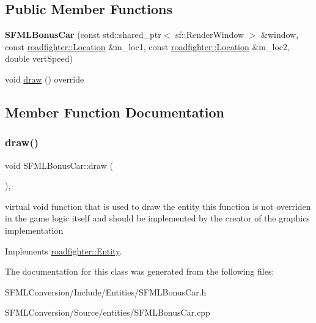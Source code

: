\subsection*{Public Member Functions}
\begin{DoxyCompactItemize}
\item 
\mbox{\label{classSFMLBonusCar_a891d1bc1e689c6343799ea8984ef2f9e}} 
{\bfseries S\+F\+M\+L\+Bonus\+Car} (const std\+::shared\+\_\+ptr$<$ sf\+::\+Render\+Window $>$ \&window, const \hyperlink{classroadfighter_1_1Location}{roadfighter\+::\+Location} \&m\+\_\+loc1, const \hyperlink{classroadfighter_1_1Location}{roadfighter\+::\+Location} \&m\+\_\+loc2, double vert\+Speed)
\item 
void \hyperlink{classSFMLBonusCar_a95d6a17fdbd099db1fe080da1581da20}{draw} () override
\end{DoxyCompactItemize}


\subsection{Member Function Documentation}
\mbox{\label{classSFMLBonusCar_a95d6a17fdbd099db1fe080da1581da20}} 
\subsubsection{\texorpdfstring{draw()}{draw()}}
{\footnotesize\ttfamily void S\+F\+M\+L\+Bonus\+Car\+::draw (\begin{DoxyParamCaption}{ }\end{DoxyParamCaption})\hspace{0.3cm}{\ttfamily [override]}, {\ttfamily [virtual]}}

virtual void function that is used to draw the entity this function is not overriden in the game logic itself and should be implemented by the creator of the graphics implementation 

Implements \hyperlink{classroadfighter_1_1Entity_ac516f8005f969ad5a86c252e5a3640ee}{roadfighter\+::\+Entity}.



The documentation for this class was generated from the following files\+:\begin{DoxyCompactItemize}
\item 
S\+F\+M\+L\+Conversion/\+Include/\+Entities/S\+F\+M\+L\+Bonus\+Car.\+h\item 
S\+F\+M\+L\+Conversion/\+Source/entities/S\+F\+M\+L\+Bonus\+Car.\+cpp\end{DoxyCompactItemize}
